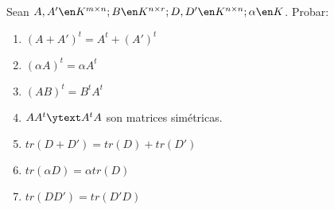 \begin{enunciado}{\ejercicio}
  Sean $A, A' \en K^{m \times n}; B \en K^{n \times r}; D, D' \en K^{n \times n}; \alpha \en K$. Probar:
  \begin{enumerate}[label=(\roman*)]
    \item $(A + A')^t = A^t + (A')^t$
    \item $(\alpha A)^t = \alpha A^t$
    \item $(AB)^t = B^tA^t$
    \item $AA^t \ytext A^tA$ son matrices simétricas.
    \item $tr(D + D') = tr(D) + tr(D')$
    \item $tr(\alpha D) = \alpha tr(D)$
    \item $tr(D D') = tr(D'D)$
  \end{enumerate}
\end{enunciado}

